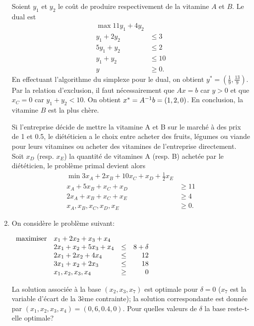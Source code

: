 \begin{enumerate}
\begin{solution}
      Soient $y_{1}$ et $y_{2}$ le coût de produire respectivement
      de la vitamine $A$ et $B$.
      Le dual est
      \begin{align*}
        \max 11y_{1} + 4y_{2}\\
        y_{1} + 2y_{2} & \leq 3\\
        5y_{1} + y_{2}  & \leq 2\\
        y_{1} + y_{2} & \leq 10\\
        y & \geq 0.
      \end{align*}
      En effectuant l'algorithme du simplexe pour le dual,
      on obtient $y^{*} = (\frac{1}{9},\frac{13}{9})$.
      Par la relation d'exclusion,
      il faut nécessairement que $Ax = b$ car $y > 0$
      et que $x_C = 0$ car $y_1 + y_2 < 10$.
      On obtient $x^* = A^{-1}b = (1,2,0)$.
      En conclusion, la vitamine $B$ est la plus chère.

      Si l'entreprise décide de mettre la vitamine A et B sur le
      marché à des prix de 1 et 0.5,
      le diététicien a le choix entre
      acheter des fruits, légumes ou viande pour leurs vitamines
      ou acheter des vitamines de l'entreprise directement.
      Soit $x_D$ (resp. $x_E$) la quantité de vitamines A (resp. B)
      achetée par le diététicien,
      le problème primal devient alors
      \begin{align*}
        \min 3x_A + 2x_B + 10x_C + x_D + \frac{1}{2}x_E\\
        x_A + 5x_B + x_C + x_D & \geq 11\\
        2x_A + x_B + x_C + x_E & \geq 4\\
        x_A, x_B, x_C, x_D, x_E & \geq 0.
      \end{align*}
    \end{solution}

  \item On considère le problème suivant:

    $
    \begin{array}{llcr}
      \mbox{maximiser} & x_1+2x_2+ x_3+x_4\\
      & 2x_1+x_2+5x_3+x_4 & \leq & 8 + \delta\\
      & 2x_1+ 2x_2+ 4x_4 & \leq & 12\\
      & 3x_1+ x_2+ 2x_3 & \leq & 18\\
      & x_1, x_2, x_3, x_4 & \geq & 0
    \end{array}
    $

    La solution associée à la base $(x_2, x_3, x_7)$ est optimale pour $\delta = 0$ ($x_7$ est la variable d'écart de la 3ème contrainte); la solution
    correspondante est donnée par $(x_1, x_2, x_3, x_4)=(0, 6, 0.4, 0)$. Pour quelles valeurs de
    $\delta$ la base reste-t-elle optimale?




\end{enumerate}

